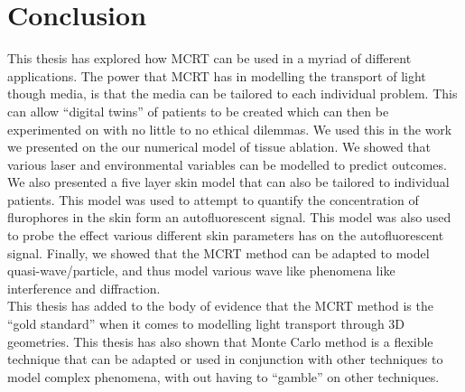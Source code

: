 \section*{Conclusion}

This thesis has explored how MCRT can be used in a myriad of different applications. 
The power that MCRT has in modelling the transport of light though media, is that the media can be tailored to each individual problem.
This can allow ``digital twins'' of patients to be created which can then be experimented on with no little to no ethical dilemmas.
We used this in the work we presented on the our numerical model of tissue ablation.
We showed that various laser and environmental variables can be modelled to predict outcomes.
We also presented a five layer skin model that can also be tailored to individual patients.
This model was used to attempt to quantify the concentration of flurophores in the skin form an autofluorescent signal.
This model was also used to probe the effect various different skin parameters has on the autofluorescent signal.
Finally, we showed that the MCRT method can be adapted to model quasi-wave/particle, and thus model various wave like phenomena like interference and diffraction.\\


This thesis has added to the body of evidence that the MCRT method is the ``gold standard'' when it comes to modelling light transport through 3D geometries.
This thesis has also shown that Monte Carlo method is a flexible technique that can be adapted or used in conjunction with other techniques to model complex phenomena, with out having to ``gamble'' on other techniques.

